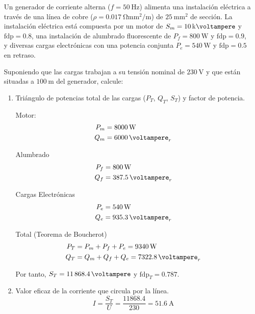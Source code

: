 \documentclass[12pt]{article}
\begin{document}

Un generador de corriente alterna ($f = \SI{50}{\hertz}$) alimenta una instalación eléctrica a través de una línea de cobre ($\rho = \SI{0.017}{\ohm\milli\meter\squared\per\meter}$) de $\SI{25}{\milli\meter\squared}$ de sección. La instalación eléctrica está compuesta por un motor de $S_m = \SI{10}{\kilo\voltampere}$ y $\mathrm{fdp} = 0.8$, una instalación de alumbrado fluorescente de $P_f = \SI{800}{\watt}$ y $\mathrm{fdp} = 0.9$, y diversas cargas electrónicas con una potencia conjunta $P_e = \SI{540}{\watt}$ y $\mathrm{fdp} = 0.5$ en retraso.

Suponiendo que las cargas trabajan a su tensión nominal de $\SI{230}{\volt}$ y que están situadas a $\SI{100}{\meter}$ del generador, calcule:

\begin{enumerate}
\item Triángulo de potencias total de las cargas ($P_T$, $Q_T$, $S_T$) y factor de potencia.

    Motor:
  \begin{align*}
    P_m &= \SI{8000}{\watt}\\
    Q_m &= \SI{6000}{\voltampere}_r\\
  \end{align*}

  Alumbrado
  \begin{align*}
    P_f &= \SI{800}{\watt}\\
    Q_f &= \SI{387.5}{\voltampere}_r\\
  \end{align*}

  Cargas Electrónicas
  \begin{align*}
    P_e &= \SI{540}{\watt}\\
    Q_e &= \SI{935.3}{\voltampere}_r\\
  \end{align*}

  Total (Teorema de Boucherot)
  \begin{align*}
    P_T &= P_m + P_f + P_e = \SI{9340}{\watt}\\
    Q_T &= Q_m + Q_f + Q_e = \SI{7322.8}{\voltampere}_r\\
  \end{align*}

  Por tanto, $S_T = \SI{11868.4}{\voltampere}$ y
  $\mathrm{fdp}_T = 0.787$.

\item Valor eficaz de la corriente que circula por la línea.
\[
  I = \frac{S_T}{U} = \frac{11868.4}{230} = \SI{51.6}{\ampere}
\]


\end{enumerate}
\end{document}
